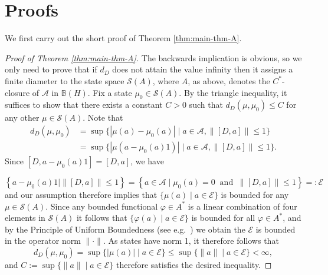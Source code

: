 \documentclass[12pt,a4paper,twoside,reqno]{amsart}
\theoremstyle{plain}
\theoremstyle{definition}
\theoremstyle{remark} %
\theoremstyle{plain}
\numberwithin{equation}{section}
\renewcommand{\leq}{\leqslant}
\newcommand{\E}[1]{\emph{#1}}
\newcommand{\A}{{\mathcal{A}}}
\newcommand{\BB}{{\mathbb{B}}}
\renewcommand{\S}{{\mathcal{S}}}
\renewcommand{\E}{{\mathcal{E}}}
\begin{document}
\section{Proofs}
We first carry out the short proof of  Theorem \ref{thm:main-thm-A}.

\begin{proof}[Proof of Theorem \ref{thm:main-thm-A}]
The backwards implication is obvious, so we only need to prove that if $d_D$ does not attain the value infinity then it assigns a finite diameter to the state space $\S(A)$, where $A$, as above, denotes the $C^*$-closure of $\A$ in $\BB(H)$. Fix a state $\mu_0\in \S(A)$. By the triangle inequality, it suffices to show that there exists a constant $C>0$ such that $d_D(\mu, \mu_0)\leq C$ for any other $\mu \in \S(A)$. Note that
\begin{align*}
d_D(\mu, \mu_0)&=\sup\{ |\mu(a)-\mu_0(a)| \mid a\in \A,  \|[D,a]\|\leq 1 \} \\
& =\sup\{ |\mu(a-\mu_0(a)1)| \mid a\in \A,  \|[D,a]\|\leq 1 \}.
\end{align*}
Since $[D, a-\mu_0(a)1]=[D,a]$, we have


\[
\left\{a-\mu_0(a)1 \mid \|[D,a]\|\leq 1\right\}=\left\{a\in \A \mid \mu_0(a)=0 \ \text{ and } \ \|[D,a]\|\leq 1 \right\}=:\E
\]
and our assumption therefore implies that $\{\mu(a) \mid a \in \E\}$ is bounded for any $\mu\in \S(A)$. Since any bounded functional $\varphi\in A^*$ is a linear combination of four elements in $\S(A)$ \cite[Corollary 4.3.7]{KaRi:FTO} it follows that $\{\varphi(a) \mid a \in \E\}$ is bounded for all $\varphi\in A^*$, and by the Principle of Uniform Boundedness (see e.g.~\cite[Proposition 8.11]{MeiseVogt}) we obtain the $\E$ is bounded in the operator norm $\|\cdot \|$. As states have norm 1, it therefore follows that
\[
d_D(\mu,\mu_0)=\sup\{ |\mu(a)| \mid a\in \E\}\leq \sup\{\|a\| \mid a\in \E \}<\infty,
\]
and $C:=\sup\{\|a\| \mid a\in \E \}$ therefore satisfies the desired inequality.
\end{proof} 
\end{document}
